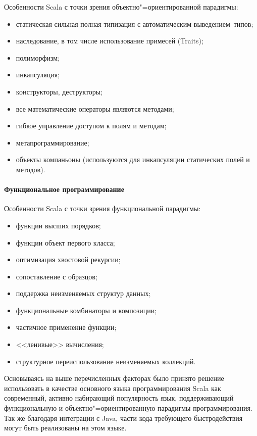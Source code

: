 Особенности Scala с точки зрения объектно"=ориентированной \mbox{парадигмы:}
\begin{itemize}
  \item статическая сильная полная типизация с автоматическим \mbox{выведением типов;}
  \item наследование, в том числе использование примесей (Traits);
  \item полиморфизм;
  \item инкапсуляция;
  \item конструкторы, деструкторы;
  \item все математические операторы являются методами;
  \item гибкое управление доступом к полям и методам;
  \item метапрограммирование;
  \item объекты компаньоны (используются для инкапсуляции статических полей и методов).
\end{itemize}

\paragraph{Функциональное программирование}
Особенности Scala с точки зрения функциональной парадигмы:
\begin{itemize}
  \item функции высших порядков;
  \item функции объект первого класса;
  \item оптимизация хвостовой рекурсии;
  \item сопоставление с образцов;
  \item поддержка неизменяемых структур данных;
  \item функциональные комбинаторы и композиции;
  \item частичное применение функции;
  \item <<ленивые>> вычисления;
  \item структурное переиспользование неизменяемых коллекций.
\end{itemize}

Основываясь на выше перечисленных факторах было принято решение использовать в качестве основного языка программирования Scala как современный, активно набирающий популярность язык, поддерживающий функциональную и объектно"=ориентированную парадигмы программирования. Так же благодаря интеграции с Java, части кода требующего быстродействия могут быть реализованы на этом языке.

